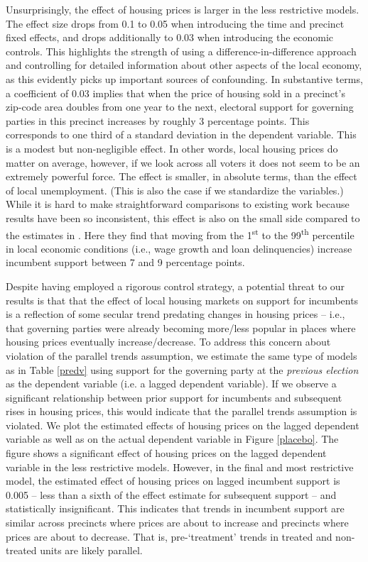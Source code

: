 \documentclass[12pt,a4paper]{article}
\begin{document}
	Unsurprisingly, the effect of housing prices is larger in the less restrictive models. The effect size drops from 0.1 to 0.05 when introducing the time and precinct fixed effects, and drops additionally to 0.03 when introducing the economic controls. This highlights the strength of using a difference-in-difference approach and controlling for detailed information about other aspects of the local economy, as this evidently picks up important sources of confounding. In substantive terms, a coefficient of 0.03 implies that when the price of housing sold in a precinct's zip-code area doubles from one year to the next, electoral support for governing parties in this precinct increases by roughly 3 percentage points. This corresponds to one third of a standard deviation in the dependent variable. This is a modest but non-negligible effect. In other words, local housing prices do matter on average, however, if we look across all voters it does not seem to be an extremely powerful force. The effect is smaller, in absolute terms, than the effect of local unemployment. (This is also the case if we standardize the variables.) While it is hard to make straightforward comparisons to existing work because results have been so inconsistent, this effect is also on the small side compared to the estimates in \cite{healy2017presidential}. Here they find that moving from the 1\textsuperscript{st} to the 99\textsuperscript{th} percentile in local economic conditions (i.e., wage growth and loan delinquencies) increase incumbent support between 7 and 9 percentage points.
	
	Despite having employed a rigorous control strategy, a potential threat to our results is that that the effect of local housing markets on support for incumbents is a reflection of some secular trend predating changes in housing prices -- i.e., that governing parties were already becoming more/less popular in places where housing prices eventually increase/decrease. To address this concern about violation of the parallel trends assumption, we estimate the same type of models as in Table \ref{predv} using support for the governing party at the \textit{previous election} as the dependent variable (i.e. a lagged dependent variable). If we observe a significant relationship between prior support for incumbents and subsequent rises in housing prices, this would indicate that the parallel trends assumption is violated. We plot the estimated effects of housing prices on the lagged dependent variable as well as on the actual dependent variable in Figure \ref{placebo}. The figure shows a significant effect of housing prices on the lagged dependent variable in the less restrictive models. However, in the final and most restrictive model, the estimated effect of housing prices on lagged incumbent support is 0.005 -- less than a sixth of the effect estimate for  subsequent support -- and statistically insignificant. This indicates that trends in incumbent support are similar across precincts where prices are about to increase and precincts where prices are about to decrease. That is, pre-‘treatment’ trends in treated and non-treated units are likely parallel.
	
\end{document}
